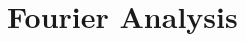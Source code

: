 \documentclass[preprint,review,12pt]{elsarticle}
\begin{document}
\section{Fourier Analysis} \label{sec::fourier}

\end{document}
